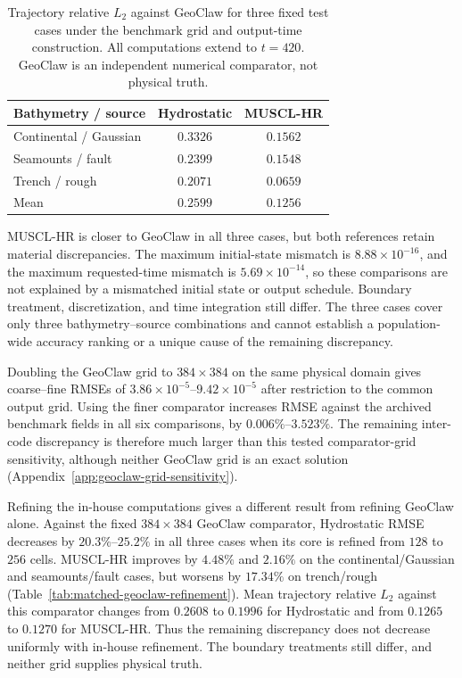 \begin{table}[pos=!htbp]
\centering
\caption{Trajectory relative $L_2$ against GeoClaw for three fixed test cases under the benchmark grid and output-time construction. All computations extend to $t=420$. GeoClaw is an independent numerical comparator, not physical truth.}
\label{tab:geoclaw-ablation}
\small
\begin{tabular}{lcc}
    \toprule
    Bathymetry / source & Hydrostatic & MUSCL-HR \\
    \midrule
    Continental / Gaussian & $0.3326$ & $0.1562$ \\
    Seamounts / fault & $0.2399$ & $0.1548$ \\
    Trench / rough & $0.2071$ & $0.0659$ \\
    Mean & $0.2599$ & $0.1256$ \\
    \bottomrule
\end{tabular}
\end{table}

MUSCL-HR is closer to GeoClaw in all three cases, but both references retain material discrepancies. The maximum initial-state mismatch is $8.88 \times 10 ^ {-16}$, and the maximum requested-time mismatch is $5.69 \times 10 ^ {-14}$, so these comparisons are not explained by a mismatched initial state or output schedule. Boundary treatment, discretization, and time integration still differ. The three cases cover only three bathymetry--source combinations and cannot establish a population-wide accuracy ranking or a unique cause of the remaining discrepancy.

Doubling the GeoClaw grid to $384 \times 384$ on the same physical domain gives coarse--fine RMSEs of $3.86 \times 10 ^ {-5}$--$9.42 \times 10 ^ {-5}$ after restriction to the common output grid. Using the finer comparator increases RMSE against the archived benchmark fields in all six comparisons, by $0.006\%$--$3.523\%$. The remaining inter-code discrepancy is therefore much larger than this tested comparator-grid sensitivity, although neither GeoClaw grid is an exact solution (Appendix~\ref{app:geoclaw-grid-sensitivity}).

Refining the in-house computations gives a different result from refining GeoClaw alone. Against the fixed $384 \times 384$ GeoClaw comparator, Hydrostatic RMSE decreases by $20.3\%$--$25.2\%$ in all three cases when its core is refined from $128$ to $256$ cells. MUSCL-HR improves by $4.48\%$ and $2.16\%$ on the continental/Gaussian and seamounts/fault cases, but worsens by $17.34\%$ on trench/rough (Table~\ref{tab:matched-geoclaw-refinement}). Mean trajectory relative $L_2$ against this comparator changes from $0.2608$ to $0.1996$ for Hydrostatic and from $0.1265$ to $0.1270$ for MUSCL-HR. Thus the remaining discrepancy does not decrease uniformly with in-house refinement. The boundary treatments still differ, and neither grid supplies physical truth.

